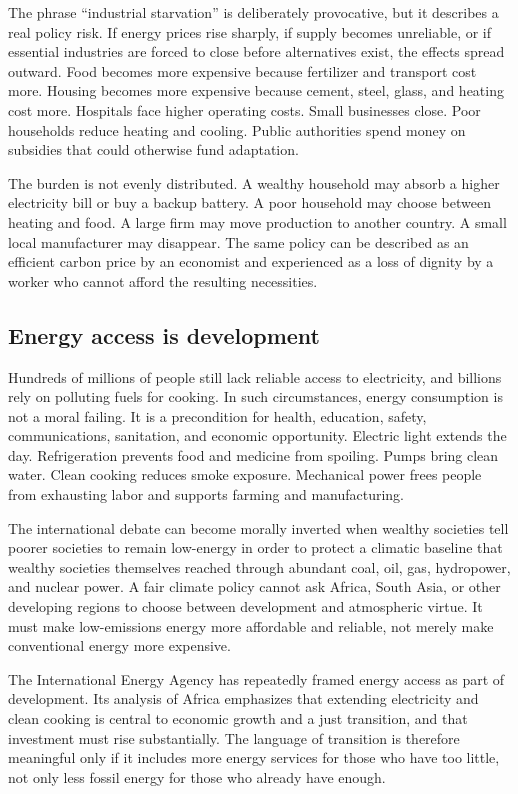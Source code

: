 ﻿\documentclass[12pt,a4paper]{book}
\begin{document}
The phrase ``industrial starvation'' is deliberately provocative, but it describes a real policy risk. If energy prices rise sharply, if supply becomes unreliable, or if essential industries are forced to close before alternatives exist, the effects spread outward. Food becomes more expensive because fertilizer and transport cost more. Housing becomes more expensive because cement, steel, glass, and heating cost more. Hospitals face higher operating costs. Small businesses close. Poor households reduce heating and cooling. Public authorities spend money on subsidies that could otherwise fund adaptation.

The burden is not evenly distributed. A wealthy household may absorb a higher electricity bill or buy a backup battery. A poor household may choose between heating and food. A large firm may move production to another country. A small local manufacturer may disappear. The same policy can be described as an efficient carbon price by an economist and experienced as a loss of dignity by a worker who cannot afford the resulting necessities.

\subsection{Energy access is development}
Hundreds of millions of people still lack reliable access to electricity, and billions rely on polluting fuels for cooking. In such circumstances, energy consumption is not a moral failing. It is a precondition for health, education, safety, communications, sanitation, and economic opportunity. Electric light extends the day. Refrigeration prevents food and medicine from spoiling. Pumps bring clean water. Clean cooking reduces smoke exposure. Mechanical power frees people from exhausting labor and supports farming and manufacturing.

The international debate can become morally inverted when wealthy societies tell poorer societies to remain low-energy in order to protect a climatic baseline that wealthy societies themselves reached through abundant coal, oil, gas, hydropower, and nuclear power. A fair climate policy cannot ask Africa, South Asia, or other developing regions to choose between development and atmospheric virtue. It must make low-emissions energy more affordable and reliable, not merely make conventional energy more expensive.

The International Energy Agency has repeatedly framed energy access as part of development. Its analysis of Africa emphasizes that extending electricity and clean cooking is central to economic growth and a just transition, and that investment must rise substantially. The language of transition is therefore meaningful only if it includes more energy services for those who have too little, not only less fossil energy for those who already have enough. \cite{IEA2024Africa,IEAAccessAffordability}
\end{document}

